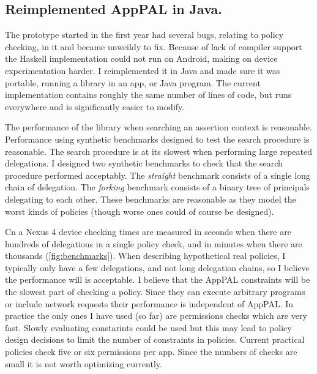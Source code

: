 \documentclass[a4paper]{scrartcl}
\begin{document}
\subsection{Reimplemented AppPAL in Java.}

The prototype started in the first year had several bugs, relating to policy checking, in it and became unweildy to fix.
Because of lack of compiler support the Haskell implementation could not run on Android, making on device experimentation harder.
I reimplemented it in Java and made sure it was portable, running a library in an app, or Java program.
The current implementation contains roughly the same number of lines of code, but runs everywhere and is significantly easier to modify.

The performance of the library when searching an assertion context is reasonable.
Performance using synthetic benchmarks designed to test the search procedure is reasonable.
The search procedure is at its slowest when performing large repeated delegations.
I designed two synthetic benchmarks to check that the search procedure performed acceptably.
The \emph{straight} benchmark consists of a single long chain of delegation.
The \emph{forking} benchmark consists of a binary tree of principals delegating to each other.
These benchmarks are reasonable as they model the worst kinds of policies (though worse ones could of course be designed).

Cn a Nexus 4 device checking times are measured in seconds when there are hundreds of delegations in a single policy check, and in minutes when there are thousands (\autoref{fig:benchmarks}).
When describing hypothetical real policies, I typically only have a few delegations, and not long delegation chains, so I believe the performance will is acceptable.
I believe that the AppPAL constraints will be the slowest part of checking a policy.
Since they can execute arbitrary programs or include network requests their performance is independent of AppPAL.
In practice the only ones I have used (so far) are permissions checks which are very fast.
Slowly evaluating constarints could be used but this may lead to policy design decisions to limit the number of constraints in policies.
Current practical policies check five or six permissions per app.
Since the numbers of checks are small it is not worth optimizing currently.
\end{document}
